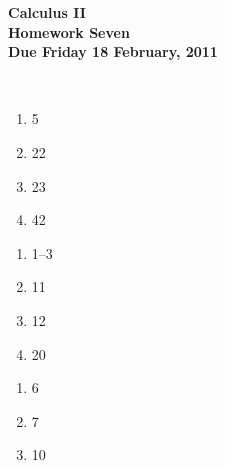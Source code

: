 \documentclass[12pt]{article}
\begin{document}
\pagestyle{empty}
 
\begin{center}
{\large {\bf Calculus II}}\\
\medskip
{\large {\bf Homework Seven}}\\
\medskip
{ {\bf Due Friday 18 February, 2011}}\\
\end{center}

\hspace{2mm}\\
   


\begin{enumerate}
\setlength{\itemsep}{-1mm}
  \item 5
  \item 22
  \item 23
  \item 42
\end{enumerate}





\begin{enumerate}
\setlength{\itemsep}{-1mm}
  \item 1--3
  \item 11
  \item 12
  \item 20 
\end{enumerate}

\begin{enumerate}
\setlength{\itemsep}{-1mm}
  \item 6
  \item 7
  \item 10
\end{enumerate}
\end{document}
